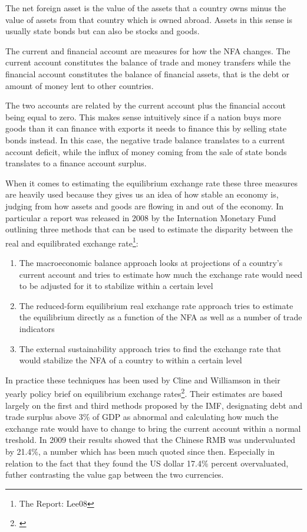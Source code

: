 \documentclass[11pt]{article}
\begin{document}
The net foreign asset is the value of the assets that a country owns 
minus the value of assets from that country which is owned abroad.  
Assets in this sense is usually state bonds but can also be stocks and 
goods.  

The current and financial account are measures for how the NFA changes.  
The current account constitutes the balance of trade and money transfers 
while the financial account constitutes the balance of financial assets, 
that is the debt or amount of money lent to other countries. 

The two accounts are related by the current account plus the financial 
accout being equal to zero. This makes sense intuitively since if a 
nation buys more goods than it can finance with exports it needs to 
finance this by selling state bonds instead. In this case, the negative 
trade balance translates to a current account deficit, while the influx 
of money coming from the sale of state bonds translates to a finance 
account surplus.

When it comes to estimating the equilibrium exchange rate these three 
measures are heavily used because they gives us an idea of how stable an 
economy is, judging from how assets and goods are flowing in and out of 
the economy. In particular a report was released in 2008 by the 
Internation Monetary Fund outlining three methods that can be used to 
estimate the disparity between the real and equilibrated exchange 
rate\footnote{The Report: \cite{pp.  1}{Lee08}}:

\begin{enumerate}
\item{The macroeconomic balance approach looks at projections of a 
	country's current account and tries to estimate how much the 
exchange rate would need to be adjusted for it to stabilize within a 
certain level}
\item{The reduced-form equilibrium real exchange rate approach tries to 
	estimate the equilibrium directly as a function of the NFA as well 
as a number of trade indicators}
\item{The external sustainability approach tries to find the exchange 
	rate that would stabilize the NFA of a country to within a certain 
level}
\end{enumerate}

In practice these techniques has been used by Cline and Williamson in 
their yearly policy brief on equilibrium exchange 
rates\footnote{\cite{cline2009,cline2012}}.  Their estimates are based 
largely on the first and third methods proposed by the IMF, designating 
debt and trade surplus above 3\% of GDP as abnormal and calculating how 
much the exchange rate would have to change to bring the current account 
within a normal treshold. In 2009 their results showed that the Chinese 
RMB was undervaluated by 21.4\%, a number which has been much quoted 
since then. Especially in relation to the fact that they found the US 
dollar 17.4\% percent overvaluated, futher contrasting the value gap 
between the two currencies.
\end{document}
